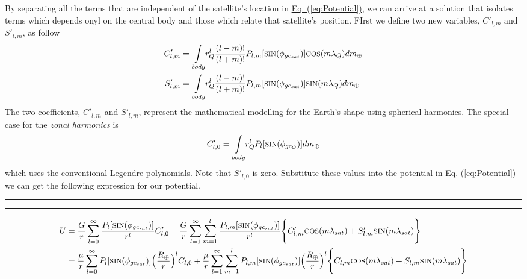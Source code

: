 \begin{multicols}{2}
By separating all the terms that are independent of the satellite's location in \hyperref[eq:Potential]{Eq. (\ref*{eq:Potential})}, we can arrive at a solution that isolates terms which depends onyl on the central body and those which relate that satellite's position. FIrst we define two new variables, $C'_{l,m}$ and $S'_{l,m}$, as follow
\begin{gather}
    \begin{split}
        C'_{l,m} &= \underset{body}{\int}r_Q^l\frac{(l-m)!}{(l+m)!}P_{l,m}[\text{\footnotesize{SIN}}(\phi_{gc_{sat}})]\text{\footnotesize{COS}}(m\lambda_Q)dm_\oplus\\
        S'_{l,m} &= \underset{body}{\int}r_Q^l\frac{(l-m)!}{(l+m)!}P_{l,m}[\text{\footnotesize{SIN}}(\phi_{gc_{sat}})]\text{\footnotesize{SIN}}(m\lambda_Q)dm_\oplus
    \end{split}
\end{gather}
The two coefficients, $C'_{l,m}$ and $S'_{l,m}$, represent the mathematical modelling for the Earth's shape using spherical harmonics. The special case for the \textit{zonal harmonics} is 
\begin{gather}
    C'_{l,0}=\underset{body}{\int}r_Q^lP_l[\text{\footnotesize{SIN}}(\phi_{gc_{Q}})]dm_\oplus
\end{gather}
which uses the conventional Legendre polynomials. Note that $S'_{l,0}$ is zero. Substitute these values into the potential in \hyperref[eq:Potential]{Eq. (\ref*{eq:Potential})} we can get the following expression for our potential. 
\end{multicols}
\par\noindent\rule{\dimexpr(0.5\columnsep-0.4pt)}{0.4pt}%
\rule{0.4pt}{6pt}

\begin{gather}
    \begin{split}
        U &= \frac{G}{r}\sum_{l=0}^{\infty}\frac{P_l[\text{\footnotesize{SIN}}(\phi_{gc_{sat}})]}{r^l}C'_{l,0}+\frac{G}{r}\sum_{l=1}^{\infty}\sum_{m=1}^{l}\frac{P_{l,m}[\text{\footnotesize{SIN}}(\phi_{gc_{sat}})]}{r^l}\Bigg\{ C'_{l,m}\text{\footnotesize{COS}}(m\lambda_{sat})+S'_{l,m}\text{\footnotesize{SIN}}(m\lambda_{sat})\Bigg\}\\
        &= \frac{\mu}{r}\sum_{l=0}^{\infty}P_l[\text{\footnotesize{SIN}}(\phi_{gc_{sat}})]\Big(\frac{R_\oplus}{r}\Big)^lC_{l,0} + \frac{\mu}{r}\sum_{l=1}^{\infty}\sum_{m=1}^{l}P_{l,m}[\text{\footnotesize{SIN}}(\phi_{gc_{sat}})]\Big(\frac{R_\oplus}{r}\Big)^l\Bigg\{C_{l,m}\text{\footnotesize{COS}}(m\lambda_{sat})+S_{l,m}\text{\footnotesize{SIN}}(m\lambda_{sat})\Bigg\}
    \end{split}
\end{gather}

